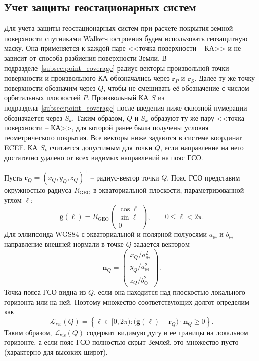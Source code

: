 \subsection{Учет защиты геостационарных систем}
\label{subsec:geoprotection}

Для учета защиты геостационарных систем \cite{ituRR2024,ituS1503_4} при
расчете покрытия земной поверхности спутниками Walker-построения будем
использовать геозащитную маску. Она применяется к каждой паре <<точка
поверхности -- КА>> и не зависит от способа разбиения поверхности Земли.
В подразделе~\ref{subsec:point_coverage} радиус-векторы произвольной точки
поверхности и произвольного КА обозначались через $\mathbf r_P$ и
$\mathbf r_S$. Далее ту же точку поверхности обозначим через $Q$, чтобы не
смешивать её обозначение с числом орбитальных плоскостей $P$. Произвольный
КА $S$ из подраздела~\ref{subsec:point_coverage} после введения ниже сквозной
нумерации обозначается через $S_k$. Таким образом, $Q$ и $S_k$ образуют ту же
пару <<точка поверхности -- КА>>, для которой ранее были получены условия
геометрического покрытия. Все векторы ниже задаются в системе координат ECEF.
КА $S_k$ считается допустимым для точки $Q$, если направление на него
достаточно удалено от всех видимых направлений на пояс ГСО.

Пусть $\mathbf r_Q=(x_Q,y_Q,z_Q)^{\mathsf T}$ -- радиус-вектор точки $Q$.
Пояс ГСО представим окружностью радиуса $R_{\mathrm{GEO}}$ в экваториальной
плоскости, параметризованной углом $\ell$:
\begin{equation}
    \mathbf g(\ell)=R_{\mathrm{GEO}}
    \begin{pmatrix}
        \cos \ell \\
        \sin \ell \\
        0
    \end{pmatrix},
    \qquad 0\leq \ell < 2\pi.
\end{equation}
Для эллипсоида WGS84 с экваториальной и полярной полуосями $a_{\oplus}$ и $b_{\oplus}$ направление внешней нормали в точке $Q$ задается вектором
\begin{equation}
    \mathbf n_Q=
    \begin{pmatrix}
        x_Q/a_{\oplus}^{2} \\
        y_Q/a_{\oplus}^{2} \\
        z_Q/b_{\oplus}^{2}
    \end{pmatrix}.
\end{equation}
Точка пояса ГСО видна из $Q$, если она находится над плоскостью локального горизонта или на ней. Поэтому множество соответствующих долгот определим как
\begin{equation}
    \mathcal{L}_{\mathrm{vis}}(Q)=
    \left\{
        \ell\in[0,2\pi):
        \bigl(\mathbf g(\ell)-\mathbf r_Q\bigr)\cdot\mathbf n_Q\geq 0
    \right\}.
    \label{eq:visible_geo_arc}
\end{equation}
Таким образом, $\mathcal{L}_{\mathrm{vis}}(Q)$ содержит видимую дугу и ее границы на локальном горизонте, а если пояс ГСО полностью скрыт Землей, это множество пусто (характерно для высоких широт).

